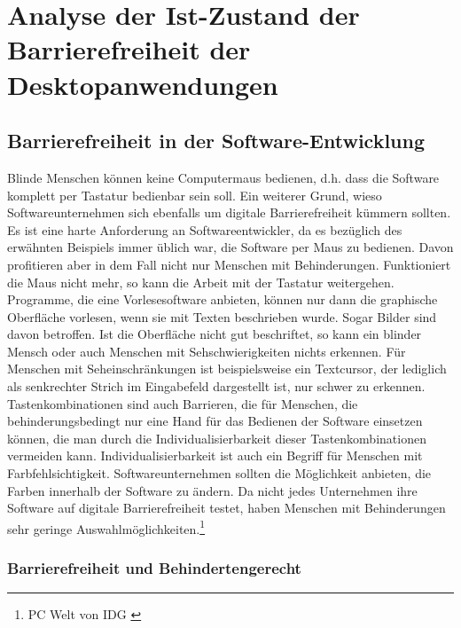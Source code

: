 \section{Analyse der Ist-Zustand der Barrierefreiheit der Desktopanwendungen}

\subsection{Barrierefreiheit in der Software-Entwicklung}
Blinde Menschen können keine Computermaus bedienen, d.h. dass die Software komplett per Tastatur bedienbar sein soll. Ein weiterer Grund, wieso Softwareunternehmen sich ebenfalls um digitale Barrierefreiheit kümmern sollten. Es ist eine harte Anforderung an Softwareentwickler, da es bezüglich des erwähnten Beispiels immer üblich war, die Software per Maus zu bedienen. Davon profitieren aber in dem Fall nicht nur Menschen mit Behinderungen. Funktioniert die Maus nicht mehr, so kann die Arbeit mit der Tastatur weitergehen. Programme, die eine Vorlesesoftware anbieten, können nur dann die graphische Oberfläche vorlesen, wenn sie mit Texten beschrieben wurde. Sogar Bilder sind davon betroffen. Ist die Oberfläche nicht gut beschriftet, so kann ein blinder Mensch oder auch Menschen mit Sehschwierigkeiten nichts erkennen. Für Menschen mit Seheinschränkungen ist beispielsweise ein Textcursor, der lediglich als senkrechter Strich im Eingabefeld dargestellt ist, nur schwer zu erkennen. Tastenkombinationen sind auch Barrieren, die für Menschen, die behinderungsbedingt nur eine Hand für das Bedienen der Software einsetzen können, die man durch die Individualisierbarkeit dieser Tastenkombinationen vermeiden kann. Individualisierbarkeit ist auch ein Begriff für Menschen mit Farbfehlsichtigkeit. Softwareunternehmen sollten die Möglichkeit anbieten, die Farben innerhalb der Software zu ändern. Da nicht jedes Unternehmen ihre Software auf digitale Barrierefreiheit testet, haben Menschen mit Behinderungen sehr geringe Auswahlmöglichkeiten.\footnote{PC Welt von IDG \cite{PcWelt}}

\subsubsection{Barrierefreiheit und Behindertengerecht}
\label{subsec:Barrierefreiheit und Behindertengerecht}

